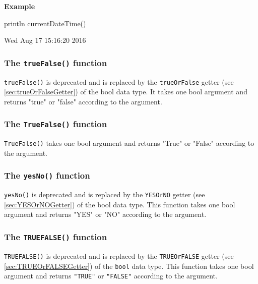 \documentclass[10pt,openright,twosides]{report}
\newcommand{\gtltype}[1]{{\small\ttfamily #1}}
\newcommand{\scst}[1]{{\footnotesize\ttfamily\colorbox{light-blue}{"#1"}}}
\newcommand{\gtlinline}[1]{\colorbox{light-blue}{\lstinline[language=gtl]{#1}}}
\newcommand{\example}{\vspace{.75em}\noindent\textbf{Example}\vspace{0em}}
\begin{document}
\example
\begin{gtl}
println currentDateTime()
\end{gtl}
\begin{console}
Wed Aug 17 15:16:20 2016
\end{console}

\subsubsection{The \texttt{trueFalse()} function}

\gtlinline{trueFalse()} is deprecated and is replaced by the \gtlinline{trueOrFalse} getter (see \ref{sec:trueOrFalseGetter}) of the \gtltype{bool} data type. It takes one bool argument and returns \scst{true} or \scst{false} according to the argument.

\subsubsection{The \texttt{TrueFalse()} function}

\gtlinline{TrueFalse()} takes one bool argument and returns \scst{True} or \scst{False} according to the argument.

\subsubsection{The \texttt{yesNo()} function}

\gtlinline{yesNo()} is deprecated and is replaced by the \gtlinline{YESOrNO} getter (see \ref{sec:YESOrNOGetter}) of the \gtltype{bool} data type. This function takes one bool argument and returns \scst{YES} or \scst{NO} according to the argument.

\subsubsection{The \texttt{TRUEFALSE()} function}

\gtlinline{TRUEFALSE()} is deprecated and is replaced by the \texttt{TRUEOrFALSE} getter (see \ref{sec:TRUEOrFALSEGetter})  of the \texttt{bool} data type. This function takes one bool argument and returns \texttt{"TRUE"} or \texttt{"FALSE"} according to the argument.
\end{document}
